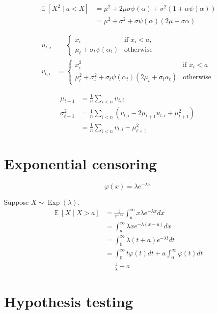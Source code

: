 \documentclass{amsart}
\renewcommand{\phi}{\varphi}
\DeclareMathOperator{\Exp}{\mathbb{E}}
\DeclareMathOperator{\Expon}{Exp}
\begin{document}
\begin{align*}
    \Exp[X^2 \mid a < X] &= \mu^2 + 2\mu\sigma \psi(\alpha) + \sigma^2(1 + \alpha\psi(\alpha))\\
    &= \mu^2 + \sigma^2 + \sigma\psi(\alpha)(2\mu + \sigma\alpha)
\end{align*}

\begin{align*}
u_{t, i} &= \begin{cases}
x_i&\text{if $x_i < a$,}\\
\mu_t + \sigma_t\psi(\alpha_t)&\text{otherwise}
\end{cases}\\
v_{t, i} &= \begin{cases}
x_i^2&\text{if $x_i < a$}\\
\mu_t^2 + \sigma_t^2 + \sigma_t\psi(\alpha_t)(2\mu_t + \sigma_t\alpha_t)&\text{otherwise}
\end{cases}
\end{align*}



\begin{align*}
\mu_{t + 1} &= \frac1n\sum_{i < n}u_{t, i}\\
\sigma^2_{t + 1} &= \frac1n\sum_{i < n}\left(v_{t, i} - 2\mu_{t + 1} u_{t, i} + \mu_{t + 1}^2\right)\\
&= \frac1n\sum_{i < n}v_{t, i} - \mu_{t + 1}^2
\end{align*}

\section{Exponential censoring}

\[
\phi(x) = \lambda e^{-\lambda x}
\]

Suppose $X\sim \Expon(\lambda)$.
\begin{align*}
\Exp[X\mid X > a] &= \frac1{e^{-\lambda a}} \int_a^\infty x\lambda e^{-\lambda x}dx\\
&= \int_a^\infty \lambda x e^{-\lambda(x - a)}dx\\
&= \int_0^\infty \lambda (t + a)e^{-\lambda t}dt\\
&= \int_0^\infty t\phi(t)dt + a\int_0^\infty \phi(t)dt\\
&= \frac1\lambda + a
\end{align*}

\section{Hypothesis testing}
\end{document}
